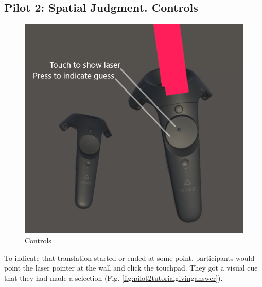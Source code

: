 \begin{appendices}
\chapter{Pilot 2: Spatial Judgment. Controls}
\label{app:pilot2_controls}
\begin{figure}[h]
	\centering
	\includegraphics[width=0.7\linewidth]{figures/pilot2_tutorial_controllers_with_explanation}
	\caption{Controls}
	\label{fig:pilot2tutorialcontrollerswithexplanation}
\end{figure}

To indicate that translation started or ended at some point, participants would point the laser pointer at the wall and click the touchpad. They got a visual cue that they had made a selection (Fig. \ref{fig:pilot2tutorialgivinganswer}).

\begin{figure}
	\centering
	

\end{figure}
\end{appendices}
